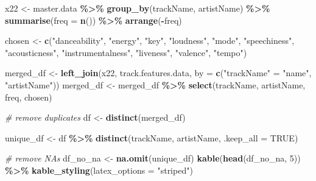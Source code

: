 \documentclass[
]{article}
\newenvironment{Shaded}{\begin{snugshade}}{\end{snugshade}}
\newcommand{\AttributeTok}[1]{\textcolor[rgb]{0.13,0.29,0.53}{#1}}
\newcommand{\CommentTok}[1]{\textcolor[rgb]{0.56,0.35,0.01}{\textit{#1}}}
\newcommand{\ConstantTok}[1]{\textcolor[rgb]{0.56,0.35,0.01}{#1}}
\newcommand{\DecValTok}[1]{\textcolor[rgb]{0.00,0.00,0.81}{#1}}
\newcommand{\FunctionTok}[1]{\textcolor[rgb]{0.13,0.29,0.53}{\textbf{#1}}}
\newcommand{\NormalTok}[1]{#1}
\newcommand{\OtherTok}[1]{\textcolor[rgb]{0.56,0.35,0.01}{#1}}
\newcommand{\SpecialCharTok}[1]{\textcolor[rgb]{0.81,0.36,0.00}{\textbf{#1}}}
\newcommand{\StringTok}[1]{\textcolor[rgb]{0.31,0.60,0.02}{#1}}
\begin{document}
\begin{Shaded}
\begin{Highlighting}[]
\NormalTok{x22 }\OtherTok{\textless{}{-}}\NormalTok{ master.data }\SpecialCharTok{\%\textgreater{}\%}
  \FunctionTok{group\_by}\NormalTok{(trackName, artistName) }\SpecialCharTok{\%\textgreater{}\%}
  \FunctionTok{summarise}\NormalTok{(}\AttributeTok{freq =} \FunctionTok{n}\NormalTok{()) }\SpecialCharTok{\%\textgreater{}\%}
  \FunctionTok{arrange}\NormalTok{(}\SpecialCharTok{{-}}\NormalTok{freq)}

\NormalTok{chosen }\OtherTok{\textless{}{-}} \FunctionTok{c}\NormalTok{(}\StringTok{"danceability"}\NormalTok{, }\StringTok{"energy"}\NormalTok{, }\StringTok{"key"}\NormalTok{, }\StringTok{"loudness"}\NormalTok{, }\StringTok{"mode"}\NormalTok{, }\StringTok{"speechiness"}\NormalTok{, }\StringTok{"acousticness"}\NormalTok{, }\StringTok{"instrumentalness"}\NormalTok{, }\StringTok{"liveness"}\NormalTok{, }\StringTok{"valence"}\NormalTok{, }\StringTok{"tempo"}\NormalTok{)}

\NormalTok{merged\_df }\OtherTok{\textless{}{-}} \FunctionTok{left\_join}\NormalTok{(x22, track.features.data, }\AttributeTok{by =} \FunctionTok{c}\NormalTok{(}\StringTok{"trackName"} \OtherTok{=} \StringTok{"name"}\NormalTok{, }\StringTok{"artistName"}\NormalTok{))}
\NormalTok{merged\_df }\OtherTok{\textless{}{-}}\NormalTok{ merged\_df }\SpecialCharTok{\%\textgreater{}\%}
  \FunctionTok{select}\NormalTok{(trackName, artistName, freq, chosen)}

\CommentTok{\# remove duplicates}
\NormalTok{df }\OtherTok{\textless{}{-}} \FunctionTok{distinct}\NormalTok{(merged\_df)}

\NormalTok{unique\_df }\OtherTok{\textless{}{-}}\NormalTok{ df }\SpecialCharTok{\%\textgreater{}\%}
  \FunctionTok{distinct}\NormalTok{(trackName, artistName, }\AttributeTok{.keep\_all =} \ConstantTok{TRUE}\NormalTok{)}

\CommentTok{\# remove NAs}
\NormalTok{df\_no\_na }\OtherTok{\textless{}{-}} \FunctionTok{na.omit}\NormalTok{(unique\_df)}
\FunctionTok{kable}\NormalTok{(}\FunctionTok{head}\NormalTok{(df\_no\_na, }\DecValTok{5}\NormalTok{)) }\SpecialCharTok{\%\textgreater{}\%}
  \FunctionTok{kable\_styling}\NormalTok{(}\AttributeTok{latex\_options =} \StringTok{"striped"}\NormalTok{)}
\end{Highlighting}
\end{Shaded}
\end{document}
